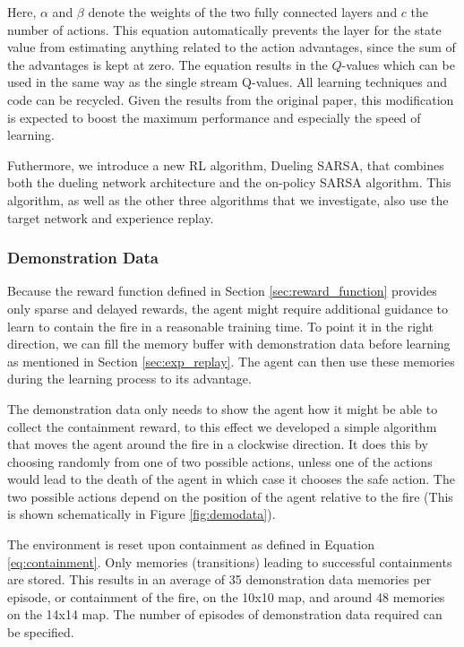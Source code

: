 Here, $\alpha$ and $\beta$ denote the weights of the two fully connected layers and $c$ the number of actions. This equation automatically prevents the layer for the state value from estimating anything related to the action advantages, since the sum of the advantages is kept at zero. The equation results in the $Q$-values which can be used in the same way as the single stream Q-values. All learning techniques and code can be recycled. Given the results from the original paper, this modification is expected to boost the maximum performance and especially the speed of learning. 

Futhermore, we introduce a new RL algorithm, Dueling SARSA, that combines both the dueling network architecture and the on-policy SARSA algorithm. This algorithm, as well as the other three algorithms that we investigate, also use the target network and experience replay.


\subsubsection{Demonstration Data}\label{sec:demo_data}
Because the reward function defined in Section \ref{sec:reward_function} provides only sparse and delayed rewards, the agent might require additional guidance to learn to contain the fire in a reasonable training time. To point it in the right direction, we can fill the memory buffer with demonstration data before learning as mentioned in Section \ref{sec:exp_replay}. The agent can then use these memories during the learning process to its advantage.

The demonstration data only needs to show the agent how it might be able to collect the containment reward, to this effect we developed a simple algorithm that moves the agent around the fire in a clockwise direction. It does this by choosing randomly from one of two possible actions, unless one of the actions would lead to the death of the agent in which case it chooses the safe action. The two possible actions depend on the position of the agent relative to the fire (This is shown schematically in Figure \ref{fig:demodata}).

The environment is reset upon containment as defined in Equation \eqref{eq:containment}. Only memories (transitions) leading to successful containments are stored. This results in an average of 35 demonstration data memories per episode, or containment of the fire, on the 10x10 map, and around 48 memories on the 14x14 map. The number of episodes of demonstration data required can be specified.

